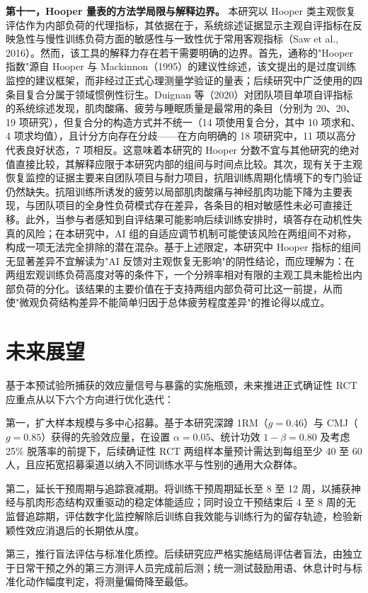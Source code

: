 \documentclass[UTF8,zihao=-4,twoside,openany]{ctexbook}
\begin{document}
\textbf{第十一，Hooper 量表的方法学局限与解释边界。} 本研究以 Hooper 类主观恢复评估作为内部负荷的代理指标，其依据在于，系统综述证据显示主观自评指标在反映急性与慢性训练负荷方面的敏感性与一致性优于常用客观指标（Saw et al., 2016）。然而，该工具的解释力存在若干需要明确的边界。首先，通称的"Hooper 指数"源自 Hooper 与 Mackinnon（1995）的建议性综述，该文提出的是过度训练监控的建议框架，而非经过正式心理测量学验证的量表；后续研究中广泛使用的四条目复合分属于领域惯例性衍生。Duignan 等（2020）对团队项目单项自评指标的系统综述发现，肌肉酸痛、疲劳与睡眠质量是最常用的条目（分别为 20、20、19 项研究），但复合分的构造方式并不统一（14 项使用复合分，其中 10 项求和、4 项求均值），且计分方向存在分歧——在方向明确的 18 项研究中，11 项以高分代表良好状态，7 项相反。这意味着本研究的 Hooper 分数不宜与其他研究的绝对值直接比较，其解释应限于本研究内部的组间与时间点比较。其次，现有关于主观恢复监控的证据主要来自团队项目与耐力项目，抗阻训练周期化情境下的专门验证仍然缺失。抗阻训练所诱发的疲劳以局部肌肉酸痛与神经肌肉功能下降为主要表现，与团队项目的全身性负荷模式存在差异，各条目的相对敏感性未必可直接迁移。此外，当参与者感知到自评结果可能影响后续训练安排时，填答存在动机性失真的风险；在本研究中，AI 组的自适应调节机制可能使该风险在两组间不对称，构成一项无法完全排除的潜在混杂。基于上述限定，本研究中 Hooper 指标的组间无显著差异不宜解读为"AI 反馈对主观恢复无影响"的阴性结论，而应理解为：在两组宏观训练负荷高度对等的条件下，一个分辨率相对有限的主观工具未能检出内部负荷的分化。该结果的主要价值在于支持两组内部负荷可比这一前提，从而使"微观负荷结构差异不能简单归因于总体疲劳程度差异"的推论得以成立。

\section{未来展望}
基于本预试验所捕获的效应量信号与暴露的实施瓶颈，未来推进正式确证性 RCT 应重点从以下六个方向进行优化迭代：

第一，扩大样本规模与多中心招募。基于本研究深蹲 1RM（$g=0.46$）与 CMJ（$g=0.85$）获得的先验效应量，在设置 $\alpha=0.05$、统计功效 $1-\beta=0.80$ 及考虑 25\% 脱落率的前提下，后续确证性 RCT 两组样本量预计需达到每组至少 40 至 60 人，且应拓宽招募渠道以纳入不同训练水平与性别的通用大众群体。

第二，延长干预周期与追踪衰减期。将训练干预周期延长至 8 至 12 周，以捕获神经与肌肉形态结构双重驱动的稳定体能适应；同时设立干预结束后 4 至 8 周的无监督追踪期，评估数字化监控解除后训练自我效能与训练行为的留存轨迹，检验新颖性效应消退后的长期依从度。

第三，推行盲法评估与标准化质控。后续研究应严格实施结局评估者盲法，由独立于日常干预之外的第三方测评人员完成前后测；统一测试鼓励用语、休息计时与标准化动作幅度判定，将测量偏倚降至最低。
\end{document}
